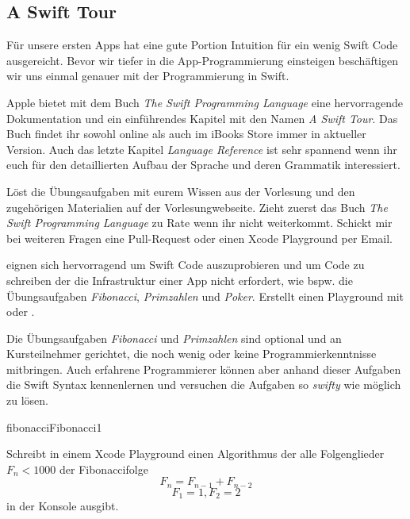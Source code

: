 \documentclass[parskip=half, final]{scrreprt}
\begin{document}
\begin{lecture} %


\chapter{A Swift Tour}

Für unsere ersten Apps hat eine gute Portion Intuition für ein wenig Swift Code ausgereicht. Bevor wir tiefer in die App-Programmierung einsteigen beschäftigen wir uns einmal genauer mit der Programmierung in Swift.

Apple bietet mit dem Buch \emph{The Swift Programming Language} eine hervorragende Dokumentation und ein einführendes Kapitel mit den Namen \emph{A Swift Tour}. Das Buch findet ihr sowohl online  als auch im iBooks Store  immer in aktueller Version. Auch das letzte Kapitel \emph{Language Reference} ist sehr spannend wenn ihr euch für den detaillierten Aufbau der Sprache und deren Grammatik interessiert.

Löst die Übungsaufgaben mit eurem Wissen aus der Vorlesung und den zugehörigen Materialien auf der Vorlesungwebseite. Zieht zuerst das Buch \emph{The Swift Programming Language} zu Rate wenn ihr nicht weiterkommt. Schickt mir bei weiteren Fragen eine Pull-Request oder einen Xcode Playground per Email.

 eignen sich hervorragend um Swift Code auszuprobieren und um Code zu schreiben der die Infrastruktur einer App nicht erfordert, wie bspw. die Übungsaufgaben \emph{Fibonacci}, \emph{Primzahlen} und \emph{Poker}. Erstellt einen Playground mit  oder .

Die Übungsaufgaben \emph{Fibonacci} und \emph{Primzahlen} sind optional und an Kursteilnehmer gerichtet, die noch wenig oder keine Programmierkenntnisse mitbringen. Auch erfahrene Programmierer können aber anhand dieser Aufgaben die Swift Syntax kennenlernen und versuchen die Aufgaben so \emph{swifty} wie möglich zu lösen.

\begin{exc}

\begin{excitem*}{fibonacci}{Fibonacci}{1}

Schreibt in einem Xcode Playground einen Algorithmus der alle Folgenglieder $F_n < 1000$ der Fibonaccifolge
\begin{equation}
F_n = F_{n-1} + F_{n-2}
\end{equation}
\begin{equation}
F_1=1, F_2=2
\end{equation}
in der Konsole ausgibt.


\end{excitem*}
\end{exc}
\end{lecture}
\end{document}
